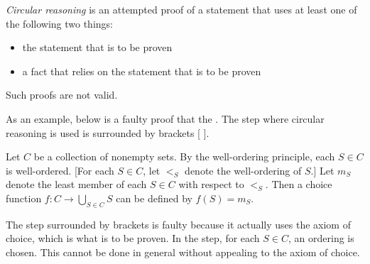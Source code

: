 \documentclass[12pt]{article}
\begin{document}
{\sl Circular reasoning\/} is an attempted proof of a statement that uses at least one of the following two things:

\begin{itemize}
\item the statement that is to be proven
\item a fact that relies on the statement that is to be proven
\end{itemize}

Such proofs are not valid.

As an example, below is a faulty proof that the .  The step where circular reasoning is used is surrounded by brackets [ ].

Let $C$ be a collection of nonempty sets.  By the well-ordering principle, each $S \in C$ is well-ordered.  [For each $S \in C$, let $<_S$ denote the well-ordering of $S$.]  Let $m_S$ denote the least member of each $S \in C$ with respect to $<_S$.  Then a choice function $\displaystyle f \colon C \to \bigcup_{S \in C} S$ can be defined by $f(S)=m_S$.

The step surrounded by brackets is faulty because it actually uses the axiom of choice, which is what is to be proven.  In the step, for each $S \in C$, an ordering is chosen.  This cannot be done in general without appealing to the axiom of choice.
\end{document}
